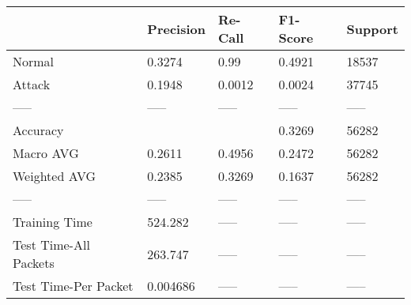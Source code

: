 \begin{tabular}{lllll}
\toprule
{} & Precision & Re-Call & F1-Score & Support \\
\midrule
Normal                &    0.3274 &    0.99 &   0.4921 &   18537 \\
Attack                &    0.1948 &  0.0012 &   0.0024 &   37745 \\
-----                 &     ----- &   ----- &    ----- &   ----- \\
Accuracy              &           &         &   0.3269 &   56282 \\
Macro AVG             &    0.2611 &  0.4956 &   0.2472 &   56282 \\
Weighted AVG          &    0.2385 &  0.3269 &   0.1637 &   56282 \\
-----                 &     ----- &   ----- &    ----- &   ----- \\
Training Time         &   524.282 &   ----- &    ----- &   ----- \\
Test Time-All Packets &   263.747 &   ----- &    ----- &   ----- \\
Test Time-Per Packet  &  0.004686 &   ----- &    ----- &   ----- \\
\bottomrule
\end{tabular}
